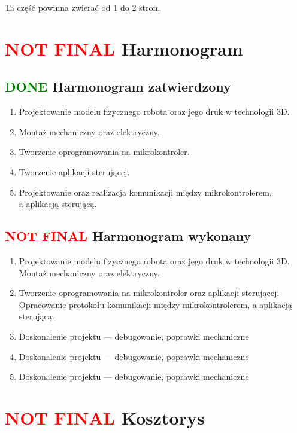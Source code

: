 \documentclass[11pt,titlepage]{article}
\begin{document}
Ta część powinna zwierać od 1 do 2 stron.

\section{\textcolor{red}{NOT FINAL} Harmonogram}

\subsection{\textcolor{green}{DONE} Harmonogram zatwierdzony}

\begin{enumerate}
    \item Projektowanie modelu fizycznego robota oraz jego druk w technologii 3D.
    \item Montaż mechaniczny oraz elektryczny.
    \item Tworzenie oprogramowania na mikrokontroler.
    \item Tworzenie aplikacji sterującej.
    \item Projektowanie oraz realizacja komunikacji między mikrokontrolerem, \\a aplikacją sterującą.
\end{enumerate}

\subsection{\textcolor{red}{NOT FINAL} Harmonogram wykonany}

\begin{enumerate}
    \item Projektowanie modelu fizycznego robota oraz jego druk w technologii 3D. Montaż mechaniczny oraz elektryczny.
    \item Tworzenie oprogramowania na mikrokontroler oraz aplikacji sterującej. Opracowanie protokołu komunikacji między mikrokontrolerem, a aplikacją sterującą.
    \item Doskonalenie projektu — debugowanie, poprawki mechaniczne
    \item Doskonalenie projektu — debugowanie, poprawki mechaniczne
    \item Doskonalenie projektu — debugowanie, poprawki mechaniczne
\end{enumerate}

\section{\textcolor{red}{NOT FINAL} Kosztorys}
\end{document}

